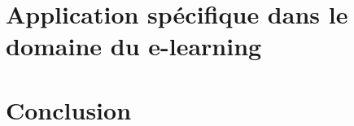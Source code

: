 \documentclass[conference]{./sty/IEEEtran}
\begin{document}
\section{Application spécifique dans le domaine du e-learning}

\section{Conclusion}




\end{document}

